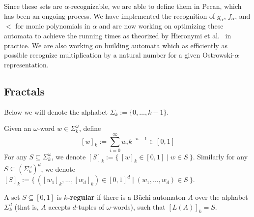 \documentclass[10pt,usenames,dvipsnames]{article}
\begin{document}
Since these sets are $\alpha$-recognizable, we are able to define them in Pecan, which has been an ongoing process. We have implemented the recognition of $g_\alpha$, $f_\alpha$, and $<$ for monic polynomials in $\alpha$ and are now working on optimizing these automata to achieve the running times as theorized by Hieronymi et al.~\cite{presb-arit} in practice. We are also working on building automata which as efficiently as possible recognize multiplication by a natural number for a given Ostrowski-$\alpha$ representation.

\subsection{Fractals}

Below we will denote the alphabet $\Sigma_k := \{ 0, \dots, k - 1 \}$.

\begin{definition}
Given an $\omega$-word $w \in \Sigma^\omega_k$, define
\[
    [w]_k := \sum^\infty_{i = 0} w_i k^{-n - 1} \in [0, 1]
\]
For any $S \subseteq \Sigma^\omega_k$, we denote $[S]_k := \{\ [w]_k \in [0, 1] \mid w \in S\ \}$.
Similarly for any $S \subseteq (\Sigma^\omega_k)^d$, we denote $[S]_k := \{\ ([w_1]_k, \dots, [w_d]_k) \in [0, 1]^d \mid (w_1, \dots, w_d) \in S\ \}$.
\end{definition}

\begin{definition}
A set $S \subseteq [0, 1]$ is \textbf{$k$-regular} if there is a B\"uchi automaton $A$ over
the alphabet $\Sigma^d_k$ (that is, $A$ accepts $d$-tuples of $\omega$-words),
such that $[L(A)]_k = S$.
\end{definition}
\end{document}

